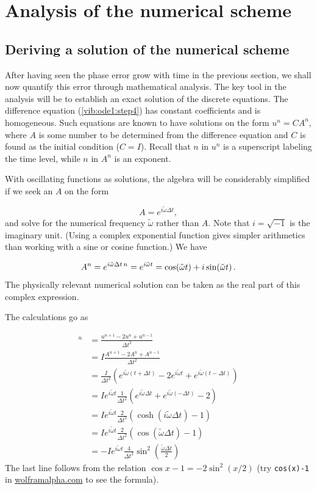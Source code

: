 \documentclass[%
oneside,                 %
final,                   %
10pt]{article}
\begin{document}

\section{Analysis of the numerical scheme}
\label{vib:ode1:analysis}

\subsection{Deriving a solution of the numerical scheme}

After having seen the phase error grow with time in the previous
section, we shall now quantify this error through mathematical
analysis.  The key tool in the analysis will be to establish an exact
solution of the discrete equations.  The difference equation
(\ref{vib:ode1:step4}) has constant coefficients and is
homogeneous. Such equations are known to have solutions on the form
$u^n=CA^n$, where $A$ is some number
to be determined from the difference equation and $C$ is found as the
initial condition ($C=I$).  Recall that $n$ in $u^n$ is a
superscript labeling the time level, while $n$ in $A^n$ is an
exponent.

With oscillating functions as solutions, the algebra will
be considerably simplified if we seek an $A$ on the form

\[ A=e^{i\tilde\omega \Delta t},\]
and solve for the numerical frequency $\tilde\omega$ rather than
$A$. Note that $i=\sqrt{-1}$ is the imaginary unit. (Using a
complex exponential function gives simpler arithmetics than working
with a sine or cosine function.)
We have

\[
A^n = e^{i\tilde\omega \Delta t\, n}=e^{i\tilde\omega t} =
\cos (\tilde\omega t) + i\sin(\tilde \omega t)
\tp
\]
The physically relevant numerical solution can
be taken as the real part of this complex expression.

The calculations go as

\begin{align*}
[D_tD_t u]^n &= \frac{u^{n+1} - 2u^n + u^{n-1}}{\Delta t^2}\\ 
&= I\frac{A^{n+1} - 2A^n + A^{n-1}}{\Delta t^2}\\ 
&= \frac{I}{\Delta t^{2}}(e^{i\tilde\omega(t+\Delta t)} - 2e^{i\tilde\omega t} + e^{i\tilde\omega(t-\Delta t)})\\ 
&= Ie^{i\tilde\omega t}\frac{1}{\Delta t^2}\left(e^{i\tilde\omega\Delta t} + e^{i\tilde\omega(-\Delta t)} - 2\right)\\ 
&= Ie^{i\tilde\omega t}\frac{2}{\Delta t^2}\left(\cosh(i\tilde\omega\Delta t) -1 \right)\\ 
&= Ie^{i\tilde\omega t}\frac{2}{\Delta t^2}\left(\cos(\tilde\omega\Delta t) -1 \right)\\ 
&= -Ie^{i\tilde\omega t}\frac{4}{\Delta t^2}\sin^2(\frac{\tilde\omega\Delta t}{2})
\end{align*}
The last line follows from the relation
$\cos x - 1 = -2\sin^2(x/2)$ (try \texttt{cos(x)-1} in
\href{{http://www.wolframalpha.com}}{wolframalpha.com} to see the formula).
\end{document}
